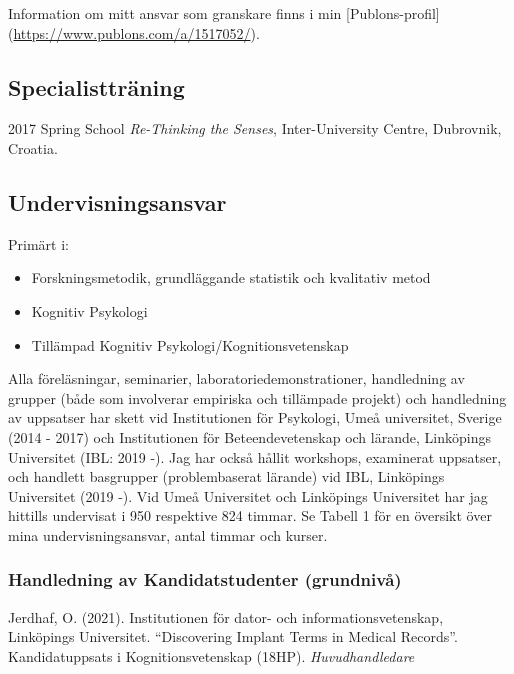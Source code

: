 \documentclass[]{article}
\providecommand{\tightlist}{%
  \setlength{\itemsep}{0pt}\setlength{\parskip}{0pt}}
\begin{document}
Information om mitt ansvar som granskare finns i min
{[}Publons-profil{]} (\url{https://www.publons.com/a/1517052/}).

\hypertarget{specialisttruxe4ning}{%
\subsection{Specialistträning}\label{specialisttruxe4ning}}

2017 Spring School \emph{Re-Thinking the Senses}, Inter-University
Centre, Dubrovnik, Croatia.

\hypertarget{undervisningsansvar}{%
\subsection{Undervisningsansvar}\label{undervisningsansvar}}

Primärt i:

\begin{itemize}
\tightlist
\item
  Forskningsmetodik, grundläggande statistik och kvalitativ metod
\item
  Kognitiv Psykologi
\item
  Tillämpad Kognitiv Psykologi/Kognitionsvetenskap
\end{itemize}

Alla föreläsningar, seminarier, laboratoriedemonstrationer, handledning
av grupper (både som involverar empiriska och tillämpade projekt) och
handledning av uppsatser har skett vid Institutionen för Psykologi, Umeå
universitet, Sverige (2014 - 2017) och Institutionen för
Beteendevetenskap och lärande, Linköpings Universitet (IBL: 2019 -). Jag
har också hållit workshops, examinerat uppsatser, och handlett
basgrupper (problembaserat lärande) vid IBL, Linköpings Universitet
(2019 -). Vid Umeå Universitet och Linköpings Universitet har jag
hittills undervisat i 950 respektive 824 timmar. Se Tabell 1 för en
översikt över mina undervisningsansvar, antal timmar och kurser.

\hypertarget{handledning-av-kandidatstudenter-grundnivuxe5}{%
\subsubsection{Handledning av Kandidatstudenter
(grundnivå)}\label{handledning-av-kandidatstudenter-grundnivuxe5}}

Jerdhaf, O. (2021). Institutionen för dator- och informationsvetenskap,
Linköpings Universitet. ``Discovering Implant Terms in Medical
Records''. Kandidatuppsats i Kognitionsvetenskap (18HP).
\emph{Huvudhandledare}
\end{document}
